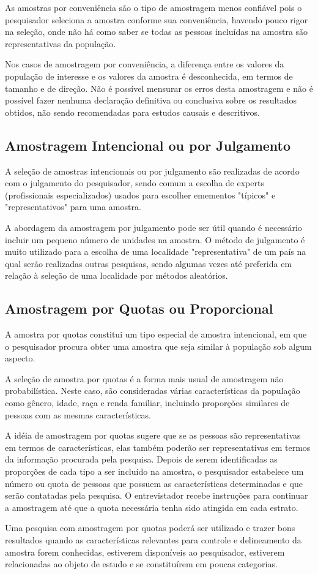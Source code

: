 As amostras por conveniência são o tipo de amostragem menos confiável pois o pesquisador seleciona a amostra conforme sua conveniência, havendo pouco rigor na seleção, onde não há como saber se todas as pessoas incluídas na amostra são representativas da população.\vskip0.3cm


Nos casos de amostragem por conveniência, a diferença entre os valores da população de interesse e os valores da amostra é desconhecida, em termos de tamanho e de direção. Não é possível mensurar os erros desta amostragem e não é possível fazer nenhuma declaração definitiva ou conclusiva sobre os resultados obtidos, não sendo recomendadas para estudos causais e descritivos.

\subsection{Amostragem Intencional ou por Julgamento}

A seleção de amostras intencionais ou por julgamento são realizadas de acordo com o julgamento do pesquisador, sendo comum a escolha de experts (profissionais especializados) usados para escolher emementos "típicos" e "representativos" para uma amostra.
\vskip0.3cm

A abordagem da amostragem por julgamento pode ser útil quando é necessário incluir um pequeno número de unidades na amostra. O método de julgamento é muito utilizado para a escolha de uma localidade "representativa" de um país na qual serão realizadas outras pesquisas, sendo algumas vezes até preferida em relação à seleção de uma localidade por métodos aleatórios.

\subsection{Amostragem por Quotas ou Proporcional}

A amostra por quotas constitui um tipo especial de amostra intencional, em que o pesquisador procura obter uma amostra que seja similar à população sob algum aspecto.\vskip0.3cm

A seleção de amostra por quotas é a forma mais usual de amostragem não probabilística. Neste caso, são consideradas várias características da população como gênero, idade, raça e renda familiar, incluindo proporções similares de pessoas com as mesmas características.\vskip0.3cm

A idéia de amostragem por quotas sugere que se as pessoas são representativas em termos de características, elas também poderão ser representativas em termos da informação procurada pela pesquisa. Depois de serem identificadas as proporções de cada tipo a ser incluído na amostra, o pesquisador estabelece um número ou quota de pessoas que possuem as características determinadas e que serão contatadas pela pesquisa. O entrevistador recebe instruções para continuar a amostragem até que a quota necessária tenha sido atingida em cada estrato.\vskip0.3cm

Uma pesquisa com amostragem por quotas poderá ser utilizado e trazer bons resultados quando as características relevantes para controle e delineamento da amostra forem conhecidas, estiverem disponíveis ao pesquisador, estiverem relacionadas ao objeto de estudo e se constituírem em poucas categorias.
